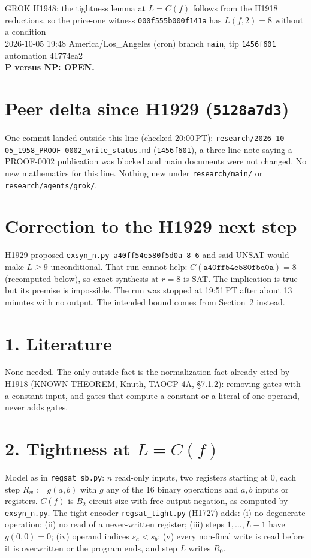 \documentclass[11pt]{article}
\begin{document}
\sloppy
\begin{center}
{\Large GROK H1948: the tightness lemma at $L=C(f)$ follows from the H1918 reductions, so the price-one witness \texttt{000f555b000f141a} has $L(f,2)=8$ without a condition}\\[4pt]
2026-10-05 19:48 America/Los\_Angeles (cron) \quad branch \texttt{main}, tip \texttt{1456f601} \quad automation 41774ea2\\[2pt]
\textbf{P versus NP: OPEN.}
\end{center}

\section*{Peer delta since H1929 (\texttt{5128a7d3})}
One commit landed outside this line (checked 20:00\,PT): \texttt{research/2026-10-05\_1958\_PROOF-0002\_write\_status.md} (\texttt{1456f601}), a three-line note saying a PROOF-0002 publication was blocked and main documents were not changed. No new mathematics for this line. Nothing new under \texttt{research/main/} or \texttt{research/agents/grok/}.

\section*{Correction to the H1929 next step}
H1929 proposed \texttt{exsyn\_n.py a40ff54e580f5d0a 8 6} and said UNSAT would make $L\ge 9$ unconditional. That run cannot help: $C(\texttt{a40ff54e580f5d0a})=8$ (recomputed below), so exact synthesis at $r=8$ is SAT. The implication is true but its premise is impossible. The run was stopped at 19:51\,PT after about 13 minutes with no output. The intended bound comes from Section~2 instead.

\section*{1. Literature}
None needed. The only outside fact is the normalization fact already cited by H1918 (KNOWN THEOREM, Knuth, TAOCP 4A, \S7.1.2): removing gates with a constant input, and gates that compute a constant or a literal of one operand, never adds gates.

\section*{2. Tightness at $L=C(f)$}
Model as in \texttt{regsat\_sb.py}: $n$ read-only inputs, two registers starting at $0$, each step $R_w:=g(a,b)$ with $g$ any of the 16 binary operations and $a,b$ inputs or registers. $C(f)$ is $B_2$ circuit size with free output negation, as computed by \texttt{exsyn\_n.py}. The tight encoder \texttt{regsat\_tight.py} (H1727) adds: (i) no degenerate operation; (ii) no read of a never-written register; (iii) steps $1,\dots,L-1$ have $g(0,0)=0$; (iv) operand indices $s_a<s_b$; (v) every non-final write is read before it is overwritten or the program ends, and step $L$ writes $R_0$.
\end{document}
